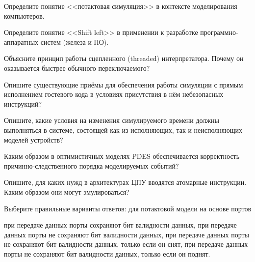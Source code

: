 \documentclass[a4paper, addpoints]{exam}
\begin{document}
\begin{questions}



\question[2] Определите понятие <<потактовая симуляция>>  в контексте моделирования компьютеров.
\begin{solution}[2cm]
\end{solution}

\question[2] Определите понятие <<Shift left>> в применении к разработке программно-аппаратных систем (железа и ПО).
\begin{solution}[2cm]
\end{solution}

\question[2] Объясните принцип работы сцепленного (threaded) интерпретатора. Почему он оказывается быстрее обычного переключаемого?
\begin{solution}[2cm]
\end{solution}

\question[2] Опишите существующие приёмы для обеспечения работы симуляции с прямым исполнением гостевого кода в условиях присутствия в нём небезопасных инструкций?
\begin{solution}[2cm]
\end{solution}

\question[2] Опишите, какие условия на изменения симулируемого времени должны выполняться в системе, состоящей как из исполняющих, так и неисполняющих моделей устройств?
\begin{solution}[2cm]
\end{solution}

\question[2] Каким образом в оптимистичных моделях PDES обеспечивается корректность причинно-следственного порядка моделируемых событий?
\begin{solution}[2cm]
\end{solution}

\question[2] Опишите, для каких нужд в архитектурах ЦПУ вводятся атомарные инструкции. Каким образом они могут эмулироваться?
\begin{solution}[2cm]
\end{solution}

\question[1] Выберите правильные варианты ответов: для потактовой модели на основе портов
\begin{choices}
    \correctchoice при передаче данных порты сохраняют бит валидности данных,
    \choice при передаче данных порты не сохраняют бит валидности данных,
    \choice при передаче данных порты не сохраняют бит валидности данных, только если он снят,
    \choice при передаче данных порты не сохраняют бит валидности данных, только если он поднят.
\end{choices}


\end{questions}
\end{document}

